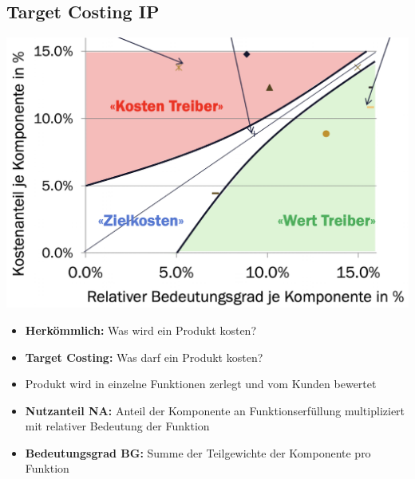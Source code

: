 \subsection{Target Costing \hfill IP}
    \begin{scriptsize}
        \begin{center}
            \includegraphics[width = 0.6\linewidth]{MAEIP_Zielkostenmatrix}
        \end{center}
        \begin{itemize}
            \item \textbf{Herkömmlich:} Was wird ein Produkt kosten?
            \item \textbf{Target Costing:} Was darf ein Produkt kosten?
            \item Produkt wird in einzelne Funktionen zerlegt und vom Kunden bewertet
            \item \textbf{Nutzanteil NA:} Anteil der Komponente an Funktionserfüllung multipliziert mit relativer Bedeutung der Funktion
            \item \textbf{Bedeutungsgrad BG:} Summe der Teilgewichte der Komponente pro Funktion
        \end{itemize}
        \vspace{-2mm}
    \end{scriptsize}